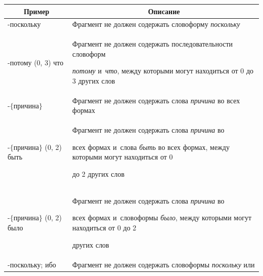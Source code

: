 \begin{table}[b]\small %


\vspace*{-12pt}


\begin{center}




\vspace*{2ex}





\begin{tabular}{|l|p{87mm}|}


\hline


\multicolumn{1}{|c|}{Пример}&\multicolumn{1}{c|}{Описание}\\


\hline


-поскольку&Фрагмент не должен содержать словоформу \textit{поскольку}\\


\hline


-потому (0, 3) что&Фрагмент не должен содержать последовательности словоформ 


\textit{потому} и~\textit{что}, между которыми могут находиться от 0 до 3 других слов\\


\hline


-$\{$причина$\}$&Фрагмент не должен содержать слова \textit{причина} во всех формах\\


\hline


-$\{$причина$\}$ (0, 2) {быть}&Фрагмент не должен содержать слова \textit{причина} во 


всех формах и~слова \textit{быть} во всех формах, между которыми могут находиться от 0 


до 2 других слов\\


\hline


-$\{$причина$\}$ (0, 2) было&Фрагмент не должен содержать слова \textit{причина} во 


всех формах и~словоформы \textit{было}, между которыми могут находиться от 0 до 2 


других слов\\


\hline


-поскольку; ибо&Фрагмент не должен содержать словоформы \textit{поскольку} или 



\end{tabular}
\end{center}
\end{table}
